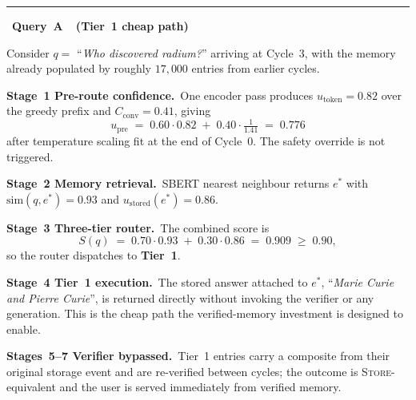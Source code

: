 \label{ex:walkthrough}
\begin{tcolorbox}[
  enhanced,
  breakable,
  width=\textwidth,
  colback=teal!3,
  colframe=teal!55!black,
  colbacktitle=teal!55!black,
  coltitle=white,
  fonttitle=\bfseries,
  title={Example~\theexample\quad End-to-end trace through CAEM on two contrasting queries},
  boxrule=0.6pt,
  arc=3pt,
  left=14pt, right=14pt, top=10pt, bottom=12pt,
  titlerule=0pt,
  attach boxed title to top left={yshift=-2mm, xshift=10pt},
  boxed title style={arc=2pt, boxrule=0pt, colback=teal!55!black},
  toptitle=2pt, bottomtitle=2pt,
  enlarge top at break by=0mm,
  enlarge bottom at break by=0mm,
]

{\color{green!45!black}\rule{6pt}{6pt}}\ \textbf{Query~A\ \ (Tier~1 cheap path)}\par\medskip

Consider $q = $ ``\emph{Who discovered radium?}'' arriving at Cycle~3, with the memory already populated by roughly $17{,}000$ entries from earlier cycles.

\medskip
\noindent\textcolor{teal!55!black}{\textbf{Stage~1 \textbar{} Pre-route confidence.}}\ One encoder pass produces $u_{\text{token}}=0.82$ over the greedy prefix and $C_{\text{conv}}=0.41$, giving
\[
u_{\text{pre}} \;=\; 0.60 \cdot 0.82 \;+\; 0.40 \cdot \tfrac{1}{1.41} \;=\; 0.776
\]
after temperature scaling fit at the end of Cycle~0. The safety override is not triggered.

\medskip
\noindent\textcolor{teal!55!black}{\textbf{Stage~2 \textbar{} Memory retrieval.}}\ SBERT nearest neighbour returns $e^{*}$ with $\mathrm{sim}(q, e^{*}) = 0.93$ and $u_{\text{stored}}(e^{*}) = 0.86$.

\medskip
\noindent\textcolor{teal!55!black}{\textbf{Stage~3 \textbar{} Three-tier router.}}\ The combined score is
\[
S(q) \;=\; 0.70 \cdot 0.93 \;+\; 0.30 \cdot 0.86 \;=\; 0.909 \;\geq\; 0.90,
\]
so the router dispatches to \textbf{Tier~1}.

\medskip
\noindent\textcolor{green!45!black}{\textbf{Stage~4 \textbar{} Tier~1 execution.}}\ The stored answer attached to $e^{*}$, ``\emph{Marie Curie and Pierre Curie}'', is returned directly without invoking the verifier or any generation. This is the cheap path the verified-memory investment is designed to enable.

\medskip
\noindent\textcolor{green!45!black}{\textbf{Stages~5--7 \textbar{} Verifier bypassed.}}\ Tier~1 entries carry a composite from their original storage event and are re-verified between cycles; the outcome is \textsc{Store}-equivalent and the user is served immediately from verified memory.


\end{tcolorbox}

